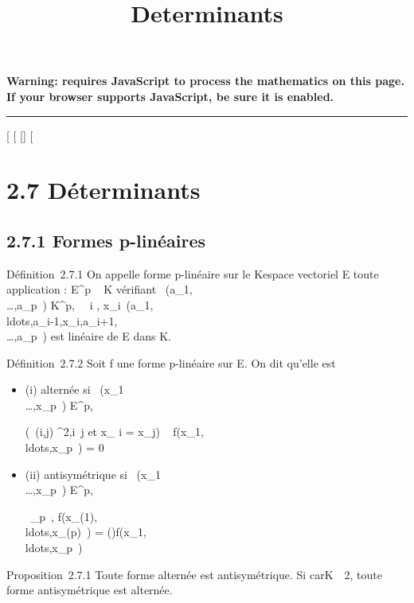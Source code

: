 \documentclass[]{article}
\title{Determinants}
\author{}
\date{}
\begin{document}
\maketitle

\textbf{Warning: 
requires JavaScript to process the mathematics on this page.\\ If your
browser supports JavaScript, be sure it is enabled.}

\begin{center}\rule{3in}{0.4pt}\end{center}

[
[
[]
[

\section{2.7 Déterminants}

\subsection{2.7.1 Formes p-linéaires}

Définition~2.7.1 On appelle forme p-linéaire sur le Kespace vectoriel E
toute application \phi : E^p \rightarrow~ K vérifiant
\forall~(a_1,\\\ldots,a_p~)
\in K^p, \forall~~i \in [1,p],
x_i\mapsto~\phi(a_1,\\ldots,a_i-1,x_i,a_i+1,\\\ldots,a_p~)
est linéaire de E dans K.

Définition~2.7.2 Soit f une forme p-linéaire sur E. On dit qu'elle est

\begin{itemize}
\item
  (i) alternée si
  \forall~(x_1\\\ldots,x_p~)
  \in E^p,

  \left (\exists~(i,j) \in
  [1,p]^2,i\neq~j\text
  et x_ i = x_j\right ) \rigtharrow~
  f(x_1,\\ldots,x_p~)
  = 0
\item
  (ii) antisymétrique si
  \forall~(x_1\\\ldots,x_p~)
  \in E^p,

  \forall~\sigma \inS_p~,
  f(x_\sigma(1),\\ldots,x_\sigma(p)~)
  =
  \epsilon(\sigma)f(x_1,\\ldots,x_p~)
\end{itemize}

Proposition~2.7.1 Toute forme alternée est antisymétrique. Si
carK\mathrel\neq~~2, toute forme
antisymétrique est alternée.
\end{document}

